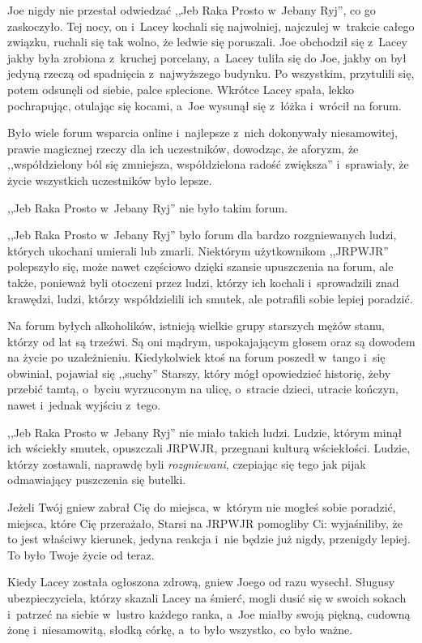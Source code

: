 \documentclass[oneside,polish,11pt,sfheadings]{mwbk}
\begin{document}
Joe nigdy nie przestał odwiedzać ,,Jeb Raka Prosto w~Jebany Ryj'', co go
zaskoczyło. Tej nocy, on i~Lacey kochali się najwolniej, najczulej w~trakcie całego związku, ruchali się tak wolno, że ledwie się poruszali.
Joe obchodził się z~Lacey jakby była zrobiona z~kruchej porcelany, a~Lacey tuliła się do Joe, jakby on był jedyną rzeczą od spadnięcia z~najwyższego budynku. Po wszystkim, przytulili się, potem odsunęli od
siebie, palce splecione. Wkrótce Lacey spała, lekko pochrapując,
otulając się kocami, a~Joe wysunął się z~łóżka i~wrócił na forum.

Było wiele forum wsparcia online i~najlepsze z~nich dokonywały
niesamowitej, prawie magicznej rzeczy dla ich uczestników, dowodząc, że
aforyzm, że ,,współdzielony ból się zmniejsza, współdzielona radość
zwiększa'' i~sprawiały, że życie wszystkich uczestników było lepsze.

,,Jeb Raka Prosto w~Jebany Ryj'' nie było takim forum.

,,Jeb Raka Prosto w~Jebany Ryj'' było forum dla bardzo rozgniewanych
ludzi, których ukochani umierali lub zmarli. Niektórym użytkownikom
,,JRPWJR'' polepszyło się, może nawet częściowo dzięki szansie
upuszczenia na forum, ale także, ponieważ byli otoczeni przez ludzi,
którzy ich kochali i~sprowadzili znad krawędzi, ludzi, którzy
współdzielili ich smutek, ale potrafili sobie lepiej poradzić.

Na forum byłych alkoholików, istnieją wielkie grupy starszych mężów
stanu, którzy od lat są trzeźwi. Są oni mądrym, uspokajającym głosem
oraz są dowodem na życie po uzależnieniu. Kiedykolwiek ktoś na forum
poszedł w~tango i~się obwiniał, pojawiał się ,,suchy'' Starszy, który
mógł opowiedzieć historię, żeby przebić tamtą, o~byciu wyrzuconym na
ulicę, o~stracie dzieci, utracie kończyn, nawet i~jednak wyjściu z~tego.

,,Jeb Raka Prosto w~Jebany Ryj'' nie miało takich ludzi. Ludzie, którym
minął ich wściekły smutek, opuszczali JRPWJR, przegnani kulturą
wściekłości. Ludzie, którzy zostawali, naprawdę byli \textit{rozgniewani},
czepiając się tego jak pijak odmawiający puszczenia się butelki.

Jeżeli Twój gniew zabrał Cię do miejsca, w~którym nie mogłeś sobie
poradzić, miejsca, które Cię przerażało, Starsi na JRPWJR pomogliby Ci:
wyjaśniliby, że to jest właściwy kierunek, jedyna reakcja i~nie będzie
już nigdy, przenigdy lepiej. To było Twoje życie od teraz.

Kiedy Lacey została ogłoszona zdrową, gniew Joego od razu wysechł.
Sługusy ubezpieczyciela, którzy skazali Lacey na śmierć, mogli dusić się
w swoich sokach i~patrzeć na siebie w~lustro każdego ranka, a~Joe miałby
swoją piękną, cudowną żonę i~niesamowitą, słodką córkę, a~to było
wszystko, co było ważne.
\end{document}
